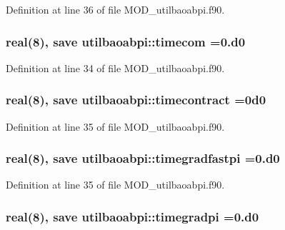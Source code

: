 Definition at line 36 of file M\-O\-D\-\_\-utilbaoabpi.\-f90.

\hypertarget{classutilbaoabpi_a50d3e390c7aa386e779ebdf2f3594903}{
\subsubsection[{timecom}]{\setlength{\rightskip}{0pt plus 5cm}real(8), save utilbaoabpi\-::timecom =0.d0}}\label{classutilbaoabpi_a50d3e390c7aa386e779ebdf2f3594903}


Definition at line 34 of file M\-O\-D\-\_\-utilbaoabpi.\-f90.

\hypertarget{classutilbaoabpi_a53b19fe49bb28da1a1e5b8c6661f4cc7}{
\subsubsection[{timecontract}]{\setlength{\rightskip}{0pt plus 5cm}real(8), save utilbaoabpi\-::timecontract =0d0}}\label{classutilbaoabpi_a53b19fe49bb28da1a1e5b8c6661f4cc7}


Definition at line 35 of file M\-O\-D\-\_\-utilbaoabpi.\-f90.

\hypertarget{classutilbaoabpi_ad957e98b45d393c84c8e00a86887d2b7}{
\subsubsection[{timegradfastpi}]{\setlength{\rightskip}{0pt plus 5cm}real(8), save utilbaoabpi\-::timegradfastpi =0.d0}}\label{classutilbaoabpi_ad957e98b45d393c84c8e00a86887d2b7}


Definition at line 35 of file M\-O\-D\-\_\-utilbaoabpi.\-f90.

\hypertarget{classutilbaoabpi_a5c70fdf8f4327a097c87c582900e7c4b}{
\subsubsection[{timegradpi}]{\setlength{\rightskip}{0pt plus 5cm}real(8), save utilbaoabpi\-::timegradpi =0.d0}}\label{classutilbaoabpi_a5c70fdf8f4327a097c87c582900e7c4b}


